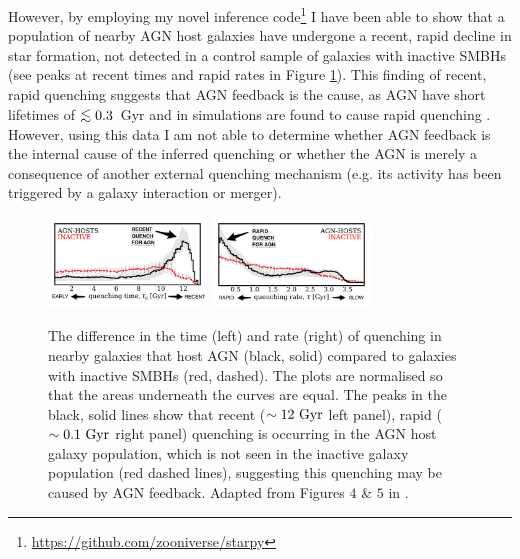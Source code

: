\documentclass[11pt]{article}
\def\lesssim{\mathrel{\hbox{\rlap{\hbox{\lower3pt\hbox{$\sim$}}}\hbox{\raise2pt\hbox{$<$}}}}}
\begin{document}
However, by employing my novel inference code\footnote{\url{https://github.com/zooniverse/starpy}} I have been able to show that a population of nearby AGN host galaxies have undergone a recent, rapid decline in star formation, not detected in a control sample of galaxies with inactive SMBHs (see peaks at recent times and rapid rates in Figure \ref{timerate}). This finding of recent, rapid quenching suggests that AGN feedback is the cause, as AGN have short lifetimes of $\lesssim0.3$~Gyr \citep{martini04} and in simulations are found to cause rapid quenching \citep{tortora09}. %
However, using this data I am not able to determine whether AGN feedback is the internal cause of the inferred quenching or whether the AGN is merely a consequence of another external quenching mechanism (e.g. its activity has been triggered by a galaxy interaction or merger). 

\begin{figure}[t]
\begin{centering}
\includegraphics[width=0.375\textwidth]{quenching_time_all_masses_bootstrap_one_morphology.pdf}
\includegraphics[width=0.375\textwidth]{quenching_rate_all_masses_bootstrap_one_morphology.pdf}
\vspace{-0.5em}
\caption[8pt]{The difference in the time (left) and rate (right) of quenching in nearby galaxies that host AGN (black, solid) compared to galaxies with inactive SMBHs (red, dashed). The plots are normalised so that the areas underneath the curves are equal. The peaks in the black, solid lines show that recent ($\sim12~\rm{Gyr}$ left panel), rapid ($\sim0.1~\rm{Gyr}$ right panel) quenching is occurring in the AGN host galaxy population, which is not seen in the inactive galaxy population (red dashed lines), suggesting this quenching may be caused by AGN feedback. Adapted from Figures $4$ \& $5$ in \cite{smethurst16}.}
\label{timerate}
\end{centering}
\vspace{-1.5em}
\end{figure}
\end{document}
